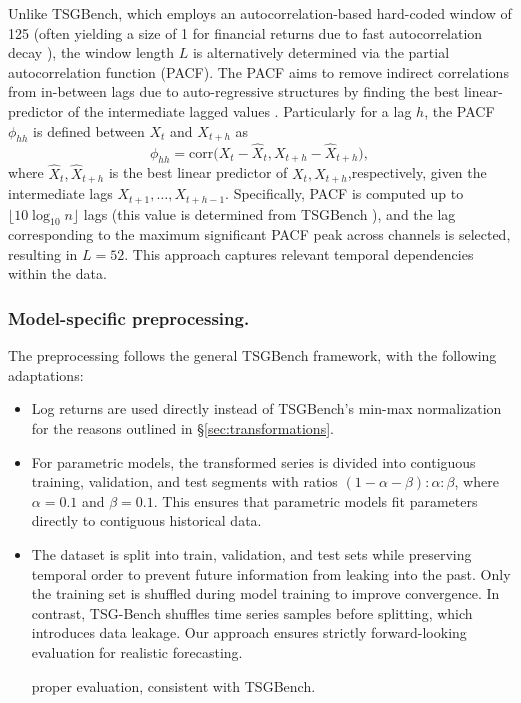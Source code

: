       Unlike TSGBench, which employs an 
        autocorrelation-based hard-coded window of 125 (often 
        yielding a size of 1 for financial returns due to fast 
        autocorrelation decay \cite{Takahashi24,Cont01}), the window
        length \(L\) is alternatively
        determined via the partial autocorrelation function (PACF).
        The PACF aims to remove indirect correlations from in-between
        lags due to auto-regressive structures by finding the 
        best linear-predictor of the intermediate lagged values
        \cite{Durbin60}. Particularly for a lag \(h\), the PACF
        \(\phi_{hh}\) is defined between \( X_t \) and \( X_{t+h}\) as
        \begin{equation*}
        \phi_{hh} = \text{corr}\bigl(X_t - \hat{X}_t, X_{t+h} - \hat{X}_{t+h}\bigr),
        \end{equation*}
        where \(\hat{X}_t, \hat{X}_{t+h}\) is the best linear 
        predictor of \(X_t, X_{t+h}\),respectively, given the
        intermediate lags \(X_{t+1}, \ldots, X_{t+h-1}\).
        Specifically, PACF is computed up to 
        \(\lfloor 10\log_{10} n \rfloor\) lags (this value is determined
        from TSGBench \cite{Ang23}), and the lag 
        corresponding to the maximum significant PACF peak across 
        channels is selected, resulting in \(L=52\). This approach 
        captures relevant temporal dependencies within the data.

    \subsubsection{Model-specific preprocessing.}\label{sec:model-specific}
    The preprocessing follows the general TSGBench framework,
    with the following adaptations:

    \begin{itemize}
        \item Log returns are used directly instead of TSGBench's 
        min-max normalization for the reasons outlined in 
        §\ref{sec:transformations}. 
        \item For parametric models, the transformed series is 
        divided into contiguous training, validation, and test 
        segments with ratios \((1-\alpha-\beta):\alpha:\beta\), 
        where \(\alpha=0.1\) and \(\beta=0.1\). This ensures that 
        parametric models fit parameters directly to contiguous 
        historical data.
  
        \item The dataset is split into train, validation, and test 
        sets while preserving temporal order to prevent future 
        information from leaking into the past. Only the training 
        set is shuffled during model training to improve 
        convergence. In contrast, TSG-Bench shuffles time series 
        samples before splitting, which introduces data leakage. 
        Our approach ensures strictly forward-looking evaluation 
        for realistic forecasting.

        proper evaluation, consistent with TSGBench.
    \end{itemize}

